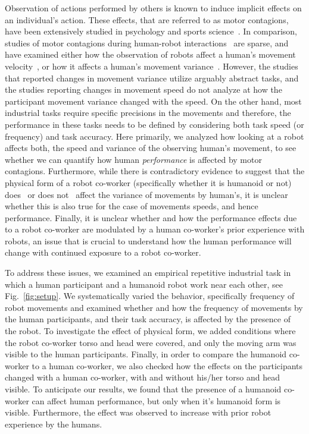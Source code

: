 \documentclass[a4paper, 12pt, oneside]{Thesis}  %
\begin{document}
Observation of actions performed by others is known to induce implicit effects on an individual's action. These effects, that are referred to as motor contagions, have been extensively studied in psychology and sports science~\cite{heyes2011automatic,Blakemore:Neuropsychologia:2005,Becchio:BJN:2007,Ganesh:Springer:2015,Ikegami:SciReport:2014,Hillebrandt:SciReports:2014,Chaminade:BRB:2008,Oztop:RAS_ICHR:2004,Kilner:CurBio:2003,Sciutti:IJSR:2012}. In comparison, studies of motor contagions during human-robot interactions~\cite{Vasalya:roman:2018} are sparse, and have examined either how the observation of robots affect a human's movement velocity~\cite{Noy:B&C:2009,Kilner:SocialNeuro:2007,Bisio:PlosOne:2010,Bisio:PlosOne:2014}, or how it affects a human's movement variance~\cite{Kupferberg:Methods:2009,Kupferberg:PlosOne:2012,Brass:ActaPsych:2001,Press:CBR:2005}. However, the studies that reported changes in movement variance utilize arguably abstract tasks, and the studies reporting changes in movement speed do not analyze at how the participant movement variance changed with the speed. On the other hand, most industrial tasks require specific precisions in the movements and therefore, the performance in these tasks needs to be defined by considering both task speed (or frequency) and task accuracy. Here primarily, we analyzed how looking at a robot affects both, the speed and variance of the observing human's movement, to see whether we can quantify how human \textit{performance} is affected by motor contagions.  
Furthermore, while there is contradictory evidence to suggest that the physical form of a robot co-worker (specifically whether it is humanoid or not) does~\cite{Chaminade:JPP:2009} or does not~\cite{Kupferberg:PlosOne:2012} affect the variance of movements by human's, it is unclear whether this is also true for the case of movements speeds, and hence performance. Finally, it is unclear whether and how the performance effects due to a robot co-worker are modulated by a human co-worker's prior experience with robots, an issue that is crucial to understand how the human performance will change with continued exposure to a robot co-worker.


To address these issues, we examined an empirical repetitive industrial task in which a human participant and a humanoid robot work near each other, see Fig.~\ref{fig:setup}. We systematically varied the behavior, specifically frequency of robot movements and examined whether and how the frequency of movements by the human participants, and their task accuracy, is affected by the presence of the robot. To investigate the effect of physical form, we added conditions where the robot co-worker torso and head were covered, and only the moving arm was visible to the human participants. Finally, in order to compare the humanoid co-worker to a human co-worker, we also checked how the effects on the participants changed with a human co-worker, with and without his/her torso and head visible. To anticipate our results, we found that the presence of a humanoid co-worker can affect human performance, but only when it's humanoid form is visible. Furthermore, the effect was observed to increase with prior robot experience by the humans.
\end{document}
